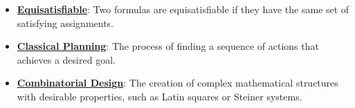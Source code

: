 \documentclass{article}%
\begin{document}
\begin{itemize}[leftmargin=*]
\item \href{https://purdue.brightspace.com/d2l/common/assets/pdfjs-d2l-dist/1.0.14-legacy/web/viewer.html?file=%2Fcontent%2Fenforced%2F1095467-wl.202510.CS.24300.001%2F13L1-Logic.pdf%3Fou%3D1095467&lang=en-us&container=d2l-fileviewer-rendered-pdf&fullscreen=d2l-fileviewer-rendered-pdf-dialog&height=667#page=24}{\textbf{Equisatisfiable}}: Two formulas are equisatisfiable if they have the same set of satisfying assignments.%
\item \href{https://purdue.brightspace.com/d2l/common/assets/pdfjs-d2l-dist/1.0.14-legacy/web/viewer.html?file=%2Fcontent%2Fenforced%2F1095467-wl.202510.CS.24300.001%2F13L1-Logic.pdf%3Fou%3D1095467&lang=en-us&container=d2l-fileviewer-rendered-pdf&fullscreen=d2l-fileviewer-rendered-pdf-dialog&height=667#page=21}{\textbf{Classical Planning}}: The process of finding a sequence of actions that achieves a desired goal.%
\item \href{https://purdue.brightspace.com/d2l/common/assets/pdfjs-d2l-dist/1.0.14-legacy/web/viewer.html?file=%2Fcontent%2Fenforced%2F1095467-wl.202510.CS.24300.001%2F13L1-Logic.pdf%3Fou%3D1095467&lang=en-us&container=d2l-fileviewer-rendered-pdf&fullscreen=d2l-fileviewer-rendered-pdf-dialog&height=667#page=22}{\textbf{Combinatorial Design}}: The creation of complex mathematical structures with desirable properties, such as Latin squares or Steiner systems.%
\end{itemize}

%
\end{document}
